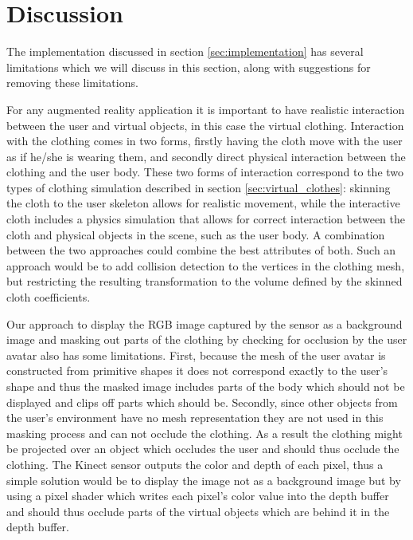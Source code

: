 \documentclass[a4paper]{article}
\begin{document}
\section{Discussion}
\label{sec:discussion}

The implementation discussed in section \ref{sec:implementation} has several limitations which we will discuss in this section, along with suggestions for removing these limitations. 

For any augmented reality application it is important to have realistic interaction between the user and virtual objects, in this case the virtual clothing. Interaction with the clothing comes in two forms, firstly having the cloth move with the user as if he/she is wearing them, and secondly direct physical interaction between the clothing and the user body. These two forms of interaction correspond to the two types of clothing simulation described in section \ref{sec:virtual_clothes}: skinning the cloth to the user skeleton allows for realistic movement, while the interactive cloth includes a physics simulation that allows for correct interaction between the cloth and physical objects in the scene, such as the user body. A combination between the two approaches could combine the best attributes of both. Such an approach would be to add collision detection to the vertices in the clothing mesh, but restricting the resulting transformation to the volume defined by the skinned cloth coefficients.

Our approach to display the RGB image captured by the sensor as a background image and masking out parts of the clothing by checking for occlusion by the user avatar also has some limitations. First, because the mesh of the user avatar is constructed from primitive shapes it does not correspond exactly to the user's shape and thus the masked image includes parts of the body which should not be displayed and clips off parts which should be. Secondly, since other objects from the user's environment have no mesh representation they are not used in this masking process and can not occlude the clothing. As a result the clothing might be projected over an object which occludes the user and should thus occlude the clothing. The Kinect sensor outputs the color and depth of each pixel, thus a simple solution would be to display the image not as a background image but by using a pixel shader which writes each pixel's color value into the depth buffer and should thus occlude parts of the virtual objects which are behind it in the depth buffer.
\end{document}
